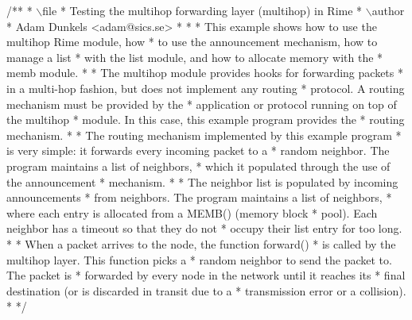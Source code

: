 \begin{DoxyCodeInclude}
\textcolor{comment}{}
\textcolor{comment}{/**}
\textcolor{comment}{ * \(\backslash\)file}
\textcolor{comment}{ *         Testing the multihop forwarding layer (multihop) in Rime}
\textcolor{comment}{ * \(\backslash\)author}
\textcolor{comment}{ *         Adam Dunkels <adam@sics.se>}
\textcolor{comment}{ *}
\textcolor{comment}{ *}
\textcolor{comment}{ *         This example shows how to use the multihop Rime module, how}
\textcolor{comment}{ *         to use the announcement mechanism, how to manage a list}
\textcolor{comment}{ *         with the list module, and how to allocate memory with the}
\textcolor{comment}{ *         memb module.}
\textcolor{comment}{ *}
\textcolor{comment}{ *         The multihop module provides hooks for forwarding packets}
\textcolor{comment}{ *         in a multi-hop fashion, but does not implement any routing}
\textcolor{comment}{ *         protocol. A routing mechanism must be provided by the}
\textcolor{comment}{ *         application or protocol running on top of the multihop}
\textcolor{comment}{ *         module. In this case, this example program provides the}
\textcolor{comment}{ *         routing mechanism.}
\textcolor{comment}{ *}
\textcolor{comment}{ *         The routing mechanism implemented by this example program}
\textcolor{comment}{ *         is very simple: it forwards every incoming packet to a}
\textcolor{comment}{ *         random neighbor. The program maintains a list of neighbors,}
\textcolor{comment}{ *         which it populated through the use of the announcement}
\textcolor{comment}{ *         mechanism.}
\textcolor{comment}{ *}
\textcolor{comment}{ *         The neighbor list is populated by incoming announcements}
\textcolor{comment}{ *         from neighbors. The program maintains a list of neighbors,}
\textcolor{comment}{ *         where each entry is allocated from a MEMB() (memory block}
\textcolor{comment}{ *         pool). Each neighbor has a timeout so that they do not}
\textcolor{comment}{ *         occupy their list entry for too long.}
\textcolor{comment}{ *}
\textcolor{comment}{ *         When a packet arrives to the node, the function forward()}
\textcolor{comment}{ *         is called by the multihop layer. This function picks a}
\textcolor{comment}{ *         random neighbor to send the packet to. The packet is}
\textcolor{comment}{ *         forwarded by every node in the network until it reaches its}
\textcolor{comment}{ *         final destination (or is discarded in transit due to a}
\textcolor{comment}{ *         transmission error or a collision).}
\textcolor{comment}{ *}
\textcolor{comment}{ */}


\end{DoxyCodeInclude}
